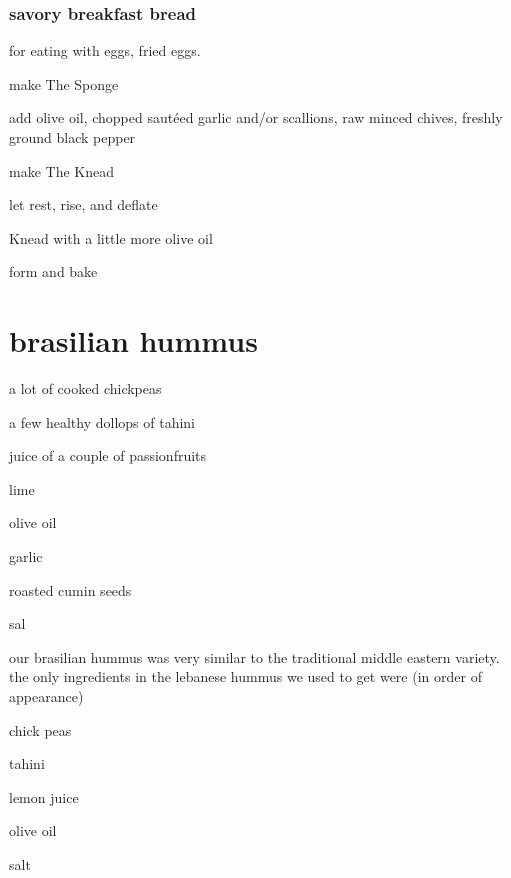 \subsubsection{savory breakfast bread}

for eating with eggs, fried eggs.

\begin{algorithm}
  \item make The Sponge
  \item add olive oil, chopped saut\'{e}ed garlic and/or scallions, raw minced chives, freshly ground black pepper 
  \item make The Knead
  \item let rest, rise, and deflate
  \item Knead with a little more olive oil
  \item form and bake
\end{algorithm}

\section{brasilian hummus}

\begin{ingredients}
  \item a lot of cooked chickpeas
  \item a few healthy dollops of \gls{tahini}
  \item juice of a couple of passionfruits
  \item lime
  \item olive oil
  \item garlic
  \item roasted cumin seeds
  \item sal
\end{ingredients}

our brasilian \gls{hummus} was very similar to the traditional middle
eastern variety. the only ingredients in the lebanese \gls{hummus} we used
to get were (in order of appearance)

\begin{ingredients}
  \item chick peas
  \item tahini
  \item lemon juice
  \item olive oil
  \item salt
\end{ingredients}

